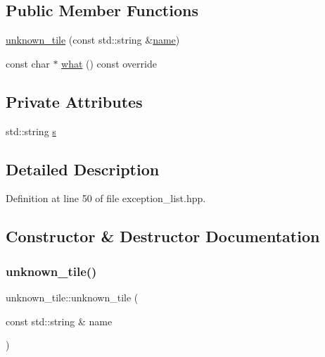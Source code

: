 \subsection*{Public Member Functions}
\begin{DoxyCompactItemize}
\item 
\hyperlink{classunknown__tile_a461cac6c68bff3bb3840332dac3930a7}{unknown\+\_\+tile} (const std\+::string \&\hyperlink{button__actions_8hpp_a9b45b3e13bd9167aab02e17e08916231}{name})
\item 
const char $\ast$ \hyperlink{classunknown__tile_acb0d54524c73e359ac6f222a698fc30c}{what} () const override
\end{DoxyCompactItemize}
\subsection*{Private Attributes}
\begin{DoxyCompactItemize}
\item 
std\+::string \hyperlink{classunknown__tile_a9327fd93d7fd68755f5b656e1943adfb}{s}
\end{DoxyCompactItemize}


\subsection{Detailed Description}


Definition at line 50 of file exception\+\_\+list.\+hpp.



\subsection{Constructor \& Destructor Documentation}
\mbox{\label{classunknown__tile_a461cac6c68bff3bb3840332dac3930a7}} 
\subsubsection{\texorpdfstring{unknown\+\_\+tile()}{unknown\_tile()}}
{\footnotesize\ttfamily unknown\+\_\+tile\+::unknown\+\_\+tile (\begin{DoxyParamCaption}\item[{const std\+::string \&}]{name }\end{DoxyParamCaption})\hspace{0.3cm}{\ttfamily [inline]}}



